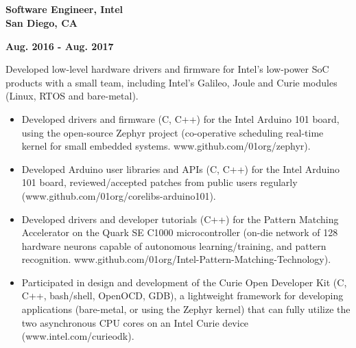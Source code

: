 \documentclass[6pt]{article}
\begin{document}
\begin{minipage}{35em}
\begin{minipage}{20em}
\subsection*{}
{\bfseries Software Engineer, Intel \\
San Diego, CA}
\end{minipage}
\hfill
\begin{minipage}{12em}
{
    \bfseries \hfill Aug. 2016 - Aug. 2017 \\

}
\end{minipage}
\break
\break
Developed low-level hardware drivers and firmware for Intel's low-power SoC products
with a small team, including Intel's Galileo, Joule and Curie modules (Linux, RTOS and
bare-metal).
\begin{itemize}
    \item Developed drivers and firmware (C, C++) for the Intel Arduino 101 board, using the
          open-source Zephyr project (co-operative scheduling real-time kernel for small
          embedded systems. www.github.com/01org/zephyr).
    \item Developed Arduino user libraries and APIs (C, C++) for the Intel Arduino 101 board,
          reviewed/accepted patches from public users regularly \\
          (www.github.com/01org/corelibs-arduino101).
    \item Developed drivers and developer tutorials (C++) for the Pattern Matching Accelerator
          on the Quark SE C1000 microcontroller (on-die network of 128 hardware neurons
          capable of autonomous learning/training, and pattern recognition.
          www.github.com/01org/Intel-Pattern-Matching-Technology).
    \item Participated in design and development of the Curie Open Developer Kit (C, C++,
          bash/shell, OpenOCD, GDB), a lightweight framework for developing applications
          (bare-metal, or using the Zephyr kernel) that can fully utilize the two asynchronous
          CPU cores on an Intel Curie device (www.intel.com/curieodk).
\end{itemize}
\end{minipage}
%
%
\hspace{2em}
\end{document}
